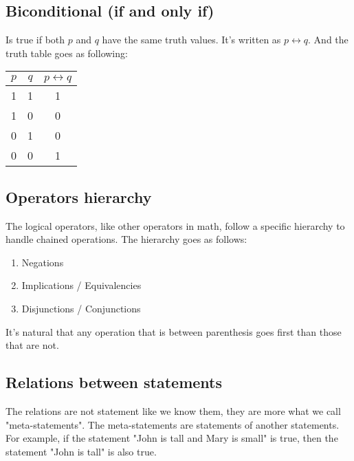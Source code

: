 \documentclass{report}
\begin{document}
    \subsection{Biconditional (if and only if)}
        Is true if both $p$ and $q$ have the same truth values. It's written as $p \leftrightarrow q$. And the truth table goes as following:

        \begin{table}[h]
            \centering
            \begin{tabular}{|c|c|c|}
            \hline
            $p$ & $q$ & $p \leftrightarrow q$ \\ \hline
            1 & 1 & 1                        \\ \hline
            1 & 0 & 0                        \\ \hline
            0 & 1 & 0                        \\ \hline
            0 & 0 & 1                        \\ \hline
            \end{tabular}
        \end{table}
    \subsection{Operators hierarchy}

        The logical operators, like other operators in math, follow a specific hierarchy to handle chained operations. The hierarchy goes as follows:

            \begin{enumerate}
                \item Negations
                \item Implications / Equivalencies
                \item Disjunctions / Conjunctions
            \end{enumerate}

        It's natural that any operation that is between parenthesis goes first than those that are not.
    \subsection{Relations between statements}
        The relations are not statement like we know them, they are more what we call "meta-statements". The meta-statements are statements of another statements. For example, if the statement "John is tall and Mary is small" is true, then the statement "John is tall" is also true.
\end{document}
